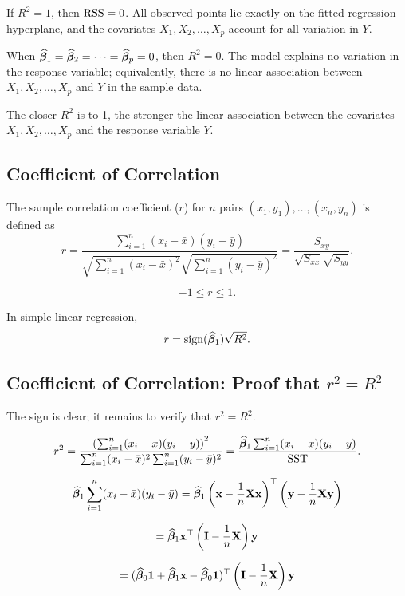 If $R^2 = 1$, then $\mathrm{RSS} = 0$. All observed points lie exactly on the fitted regression hyperplane, and the covariates $X_1, X_2, \dots, X_p$ account for all variation in $Y$.

When $\widehat{\boldsymbol{\beta}}_1 = \widehat{\boldsymbol{\beta}}_2 = \cdots = \widehat{\boldsymbol{\beta}}_p = 0$, then $R^2 = 0$. The model explains no variation in the response variable; equivalently, there is no linear association between $X_1, X_2, \dots, X_p$ and $Y$ in the sample data.

The closer $R^2$ is to 1, the stronger the linear association between the covariates $X_1, X_2, \dots, X_p$ and the response variable $Y$.

\subsection{Coefficient of Correlation}

The sample correlation coefficient ($r$) for $n$ pairs $(x_1, y_1), \dots, (x_n, y_n)$ is defined as
\[
r = \frac{\sum_{i=1}^{n} (x_i - \bar{x})(y_i - \bar{y})}
{\sqrt{\sum_{i=1}^{n} (x_i - \bar{x})^2}\sqrt{\sum_{i=1}^{n} (y_i - \bar{y})^2}}
= \frac{S_{xy}}{\sqrt{S_{xx}}\sqrt{S_{yy}}}.
\]

\[
-1 \leq r \leq 1.
\]

In simple linear regression,
\[
r = \operatorname{sign}(\widehat{\boldsymbol{\beta}}_1)\sqrt{R^2}.
\]

\subsection{Coefficient of Correlation: Proof that $r^2 = R^2$}

The sign is clear; it remains to verify that $r^2 = R^2$.

\[
r^2 = \frac{\left(\sum_{i=1}^{n} (x_i - \bar{x})(y_i - \bar{y})\right)^2}
{\sum_{i=1}^{n} (x_i - \bar{x})^2 \sum_{i=1}^{n} (y_i - \bar{y})^2}
= \frac{\widehat{\boldsymbol{\beta}}_1 \sum_{i=1}^{n} (x_i - \bar{x})(y_i - \bar{y})}{\mathrm{SST}}.
\]

\[
\widehat{\boldsymbol{\beta}}_1 \sum_{i=1}^{n} (x_i - \bar{x})(y_i - \bar{y})
= \widehat{\boldsymbol{\beta}}_1 \left(\mathbf{x} - \frac{1}{n}\mathbf{X}\mathbf{x}\right)^\top
\left(\mathbf{y} - \frac{1}{n}\mathbf{X}\mathbf{y}\right)
\]

\[
= \widehat{\boldsymbol{\beta}}_1 \mathbf{x}^\top \left(\mathbf{I} - \frac{1}{n}\mathbf{X}\right)\mathbf{y}
\]

\[
= (\widehat{\boldsymbol{\beta}}_0 \mathbf{1} + \widehat{\boldsymbol{\beta}}_1 \mathbf{x} - \widehat{\boldsymbol{\beta}}_0 \mathbf{1})^\top
\left(\mathbf{I} - \frac{1}{n}\mathbf{X}\right)\mathbf{y}
\]

